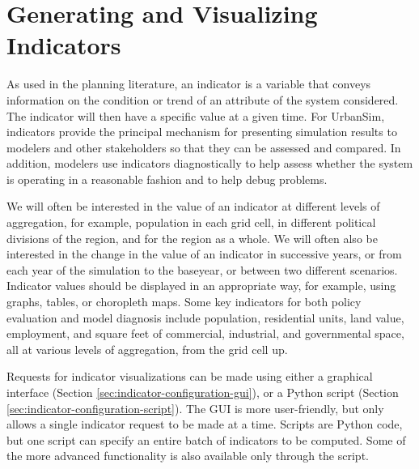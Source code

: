 

\chapter{Generating and Visualizing Indicators}
\indicatorsindex

As used in the planning literature, an indicator is a
variable \variablesindex that conveys information on the condition or
trend of an attribute \attributesindex of the system considered.  The
indicator will then have a specific value at a given time.
For UrbanSim, indicators provide the principal mechanism
for presenting simulation results to modelers and other stakeholders so
that they can be assessed and compared.  In addition, modelers use
indicators diagnostically to help assess whether the
system is operating in a reasonable fashion and to help debug problems.

We will often be interested in the value of an indicator at different levels of
aggregation, for example, 
population in each grid cell, in different political divisions of
the region, and for the region as a whole.  We will often also be
interested in the change in the value of an indicator
in successive years, or from each year of the
simulation to the baseyear, or between two different scenarios.
Indicator values should be displayed in an
appropriate way, for example, using graphs,
 tables,  or choropleth maps.
 Some key indicators for both policy
evaluation and model diagnosis include population, residential
units, land value, employment, and square feet of commercial,
industrial, and governmental space, all at various levels of
aggregation, from the grid cell up.

Requests for indicator visualizations can be made using either a graphical
interface (Section \ref{sec:indicator-configuration-gui}), or a Python
script (Section \ref{sec:indicator-configuration-script}).  The GUI is more
user-friendly, but only allows a single indicator request to be made at a
time.  Scripts are Python code, but one script can specify an entire
batch of indicators to be computed. Some of the more advanced functionality is
also available only through the script. 

